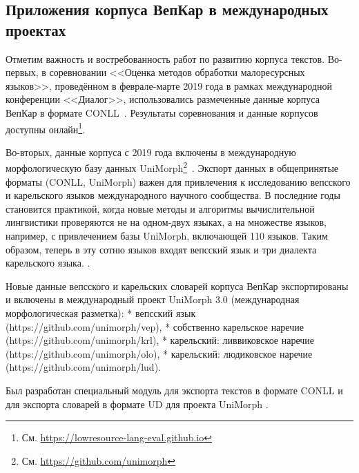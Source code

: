 \subsection{Приложения корпуса ВепКар в международных проектах} \label{sect_VepKar_international}


Отметим важность и востребованность работ по развитию корпуса текстов. 
Во-первых, в соревновании <<Оценка методов обработки малоресурсных языков>>, 
проведённом в феврале-марте 2019 года 
в рамках международной конференции <<Диалог>>, 
использовались размеченные данные корпуса ВепКар 
в формате CONLL~\cite{Klyachko2019LowresourceEval}. 
Результаты соревнования и данные корпусов 
доступны онлайн\footnote{См. \url{https://lowresource-lang-eval.github.io}}.

Во-вторых, данные корпуса с 2019 года включены 
в международную морфологическую базу данных 
UniMorph\footnote{См. \url{https://github.com/unimorph}}~\cite{McCarthy2020Unimorph}. 
Экспорт данных в общепринятые форматы (CONLL, UniMorph) 
важен для привлечения к исследованию вепсского и карельского языков 
международного научного сообщества. 
В последние годы становится практикой, 
когда новые методы и алгоритмы вычислительной лингвистики 
проверяются не на одном-двух языках, 
а на множестве языков, например, с привлечением базы UniMorph, включающей 110 языков. 
Таким образом, теперь в эту сотню языков входят вепсский язык и три диалекта карельского языка. 
.

Новые данные вепсского и карельских словарей корпуса ВепКар экспортированы и включены в международный проект UniMorph 3.0 (международная морфологическая разметка):
* вепсский язык (https://github.com/unimorph/vep),
* собственно карельское наречие (https://github.com/unimorph/krl),
* карельский: ливвиковское наречие (https://github.com/unimorph/olo),
* карельский: людиковское наречие (https://github.com/unimorph/lud).

Был разработан специальный модуль для экспорта текстов в формате CONLL и 
для экспорта словарей в формате UD для проекта UniMorph .
 